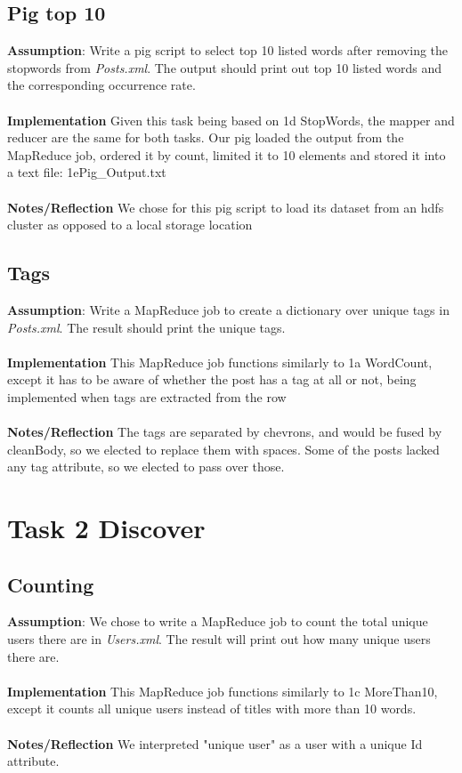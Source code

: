 \documentclass[fleqn,10pt]{wlscirep}
\begin{document}
\subsection{Pig top 10}
\textbf{Assumption}: Write a pig script to select top 10 listed words after removing the stopwords from \textit{Posts.xml}. The output should print out top 10 listed words and the corresponding occurrence rate.\\ \\
\textbf{Implementation} Given this task being based on 1d StopWords, the mapper and reducer are the same for both tasks. Our pig loaded the output from the MapReduce job, ordered it by count, limited it to 10 elements and stored it into a text file: 1ePig\_Output.txt \\ \\
\textbf{Notes/Reflection} We chose for this pig script to load its dataset from an hdfs cluster as opposed to a local storage location


\subsection{Tags}
\textbf{Assumption}: Write a MapReduce job to create a dictionary over unique tags in  \textit{Posts.xml}. The result should print the unique tags.\\ \\
\textbf{Implementation} This MapReduce job functions similarly to 1a WordCount, except it has to be aware of whether the post has a tag at all or not, being implemented when tags are extracted from the row \\ \\
\textbf{Notes/Reflection} The tags are separated by chevrons, and would be fused by cleanBody, so we elected to replace them with spaces. Some of the posts lacked any tag attribute, so we elected to pass over those.



\section{Task 2 Discover}

\subsection{Counting}
\textbf{Assumption}: We chose to write a MapReduce job to count the total unique users there are in \textit{Users.xml}. The result will print out how many unique users there are.\\ \\
\textbf{Implementation} This MapReduce job functions similarly to 1c MoreThan10, except it counts all unique users instead of titles with more than 10 words. \\ \\
\textbf{Notes/Reflection} We interpreted "unique user" as a user with a unique Id attribute.

\end{document}
